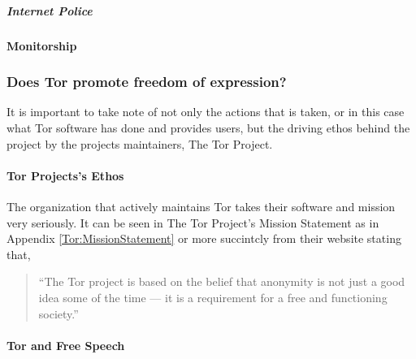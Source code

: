 \documentclass[11pt]{article}
\begin{document}
\begin{multicols}{2}
\subparagraph{Internet Police}


\paragraph{Monitorship}



\subsubsection{Does Tor promote freedom of expression?}

It is important to take note of not only the actions that is taken, or in this
case what Tor software has done and provides users, but the driving ethos behind
the project by the projects maintainers, The Tor Project.

\paragraph{Tor Projects's Ethos}

The organization that actively maintains Tor takes their software and mission
very seriously. It can be seen in The Tor Project's Mission Statement as in
Appendix \ref{Tor:MissionStatement} or more succintcly from their website
stating that,


\begin{quotation} 
  
  ``The Tor project is based on the belief that anonymity is not just a good
  idea some of the time — it is a requirement for a free and functioning
  society.''\cite{Tor:Users}

\end{quotation}


\paragraph{Tor and Free Speech}


\end{multicols}
\end{document}
